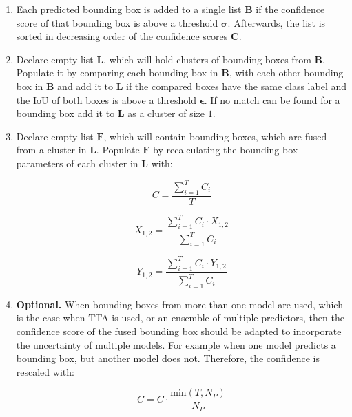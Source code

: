 \begin{enumerate}

    \item Each predicted bounding box is added to a single list $\mathbf{B}$ if the confidence score of that bounding box is above a threshold $\boldsymbol{\sigma}$. Afterwards, the list is sorted in decreasing order of the confidence scores $\mathbf{C}$.

    \item Declare empty list $\mathbf{L}$, which will hold clusters of bounding boxes from $\mathbf{B}$.  Populate it by comparing each bounding box in $\mathbf{B}$, with each other bounding box in $\mathbf{B}$ and add it to $\mathbf{L}$ if the compared boxes have the same class label and the \ac{IoU} of both boxes is above a threshold $\boldsymbol{\epsilon}$. If no match can be found for a bounding box add it to $\mathbf{L}$ as a cluster of size $1$.

    \item Declare empty list $\mathbf{F}$, which will contain bounding boxes, which are fused from a cluster in $\mathbf{L}$. Populate $\mathbf{F}$ by recalculating the bounding box parameters of each cluster in $\mathbf{L}$ with:

    \begin{equation}
        C = \frac{\sum^T_{i=1} C_i}{T}
    \end{equation}

    \begin{equation}
        X_{1,2} = \frac{\sum^T_{i=1} C_i \cdot X_{1,2}}{\sum^T_{i=1} C_i}
    \end{equation}

    \begin{equation}
        Y_{1,2} = \frac{\sum^T_{i=1} C_i \cdot Y_{1,2}}{\sum^T_{i=1} C_i}
    \end{equation}

    \item \textbf{Optional.} When bounding boxes from more than one model are used, which is the case when \ac{TTA} is used, or an ensemble of multiple predictors, then the confidence score of the fused bounding box should be adapted to incorporate the uncertainty of multiple models. For example when one model predicts a bounding box, but another model does not. Therefore, the confidence is rescaled with:

    \begin{equation}
        C = C \cdot \frac{\text{min}(T, N_P)}{N_P}
        \label{eq:confidence_rescale}
    \end{equation}


\end{enumerate}
